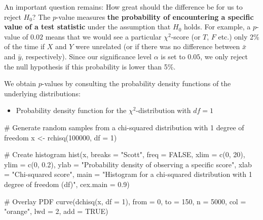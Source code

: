 \documentclass[
  11pt,
  letterpaper,
  DIV=11,
  numbers=noendperiod]{scrreprt}
\newenvironment{Shaded}{\begin{snugshade}}{\end{snugshade}}
\newcommand{\AttributeTok}[1]{\textcolor[rgb]{0.40,0.45,0.13}{#1}}
\newcommand{\CommentTok}[1]{\textcolor[rgb]{0.37,0.37,0.37}{#1}}
\newcommand{\ConstantTok}[1]{\textcolor[rgb]{0.56,0.35,0.01}{#1}}
\newcommand{\DecValTok}[1]{\textcolor[rgb]{0.68,0.00,0.00}{#1}}
\newcommand{\FloatTok}[1]{\textcolor[rgb]{0.68,0.00,0.00}{#1}}
\newcommand{\FunctionTok}[1]{\textcolor[rgb]{0.28,0.35,0.67}{#1}}
\newcommand{\NormalTok}[1]{\textcolor[rgb]{0.00,0.23,0.31}{#1}}
\newcommand{\OtherTok}[1]{\textcolor[rgb]{0.00,0.23,0.31}{#1}}
\newcommand{\StringTok}[1]{\textcolor[rgb]{0.13,0.47,0.30}{#1}}
\providecommand{\tightlist}{%
  \setlength{\itemsep}{0pt}\setlength{\parskip}{0pt}}\usepackage{longtable,booktabs,array}
\begin{document}
An important question remains: How great should the difference be for us
to reject \(H_0\)? The \(p\)-value measures \textbf{the probability of
encountering a specific value of a test statistic} under the assumption
that \(H_0\) holds. For example, a \(p\)-value of \(0.02\) means that we
would see a particular \(\chi^2\)-score (or \(T\), \(F\) etc.) only 2\%
of the time if \(X\) and \(Y\) were unrelated (or if there was no
difference between \(\bar{x}\) and \(\bar{y}\), respectively). Since our
significance level \(\alpha\) is set to \(0.05\), we only reject the
null hypothesis if this probability is lower than 5\%.

We obtain \(p\)-values by consulting the probability density functions
of the underlying distributions:

\begin{itemize}
\tightlist
\item
  Probability density function for the \(\chi^2\)-distribution with
  \(df = 1\)
\end{itemize}

\begin{Shaded}
\begin{Highlighting}[]
\CommentTok{\# Generate random samples from a chi{-}squared distribution with 1 degree of freedom}
\NormalTok{x }\OtherTok{\textless{}{-}} \FunctionTok{rchisq}\NormalTok{(}\DecValTok{100000}\NormalTok{, }\AttributeTok{df =} \DecValTok{1}\NormalTok{)}

\CommentTok{\# Create histogram}
\FunctionTok{hist}\NormalTok{(x,}
     \AttributeTok{breaks =} \StringTok{"Scott"}\NormalTok{,}
     \AttributeTok{freq =} \ConstantTok{FALSE}\NormalTok{,}
     \AttributeTok{xlim =} \FunctionTok{c}\NormalTok{(}\DecValTok{0}\NormalTok{, }\DecValTok{20}\NormalTok{),}
     \AttributeTok{ylim =} \FunctionTok{c}\NormalTok{(}\DecValTok{0}\NormalTok{, }\FloatTok{0.2}\NormalTok{),}
     \AttributeTok{ylab =} \StringTok{"Probability density of observing a specific score"}\NormalTok{,}
     \AttributeTok{xlab =} \StringTok{"Chi{-}squared score"}\NormalTok{,}
     \AttributeTok{main =} \StringTok{"Histogram for a chi{-}squared distribution with 1 degree of freedom (df)"}\NormalTok{,}
     \AttributeTok{cex.main =} \FloatTok{0.9}\NormalTok{)}

\CommentTok{\# Overlay PDF}
\FunctionTok{curve}\NormalTok{(}\FunctionTok{dchisq}\NormalTok{(x, }\AttributeTok{df =} \DecValTok{1}\NormalTok{), }\AttributeTok{from =} \DecValTok{0}\NormalTok{, }\AttributeTok{to =} \DecValTok{150}\NormalTok{, }\AttributeTok{n =} \DecValTok{5000}\NormalTok{, }\AttributeTok{col =} \StringTok{"orange"}\NormalTok{, }\AttributeTok{lwd =} \DecValTok{2}\NormalTok{, }\AttributeTok{add =} \ConstantTok{TRUE}\NormalTok{)}
\end{Highlighting}
\end{Shaded}
\end{document}
